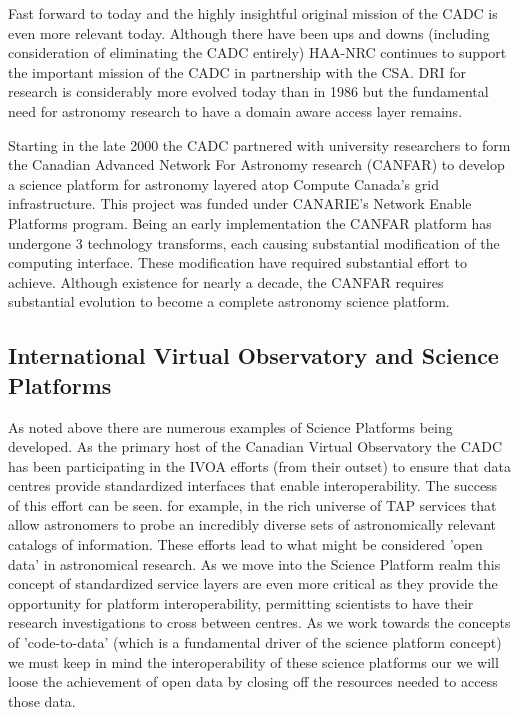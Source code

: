 \documentclass[11pt]{article}
\begin{document}
Fast forward to today and the highly insightful  original mission of the CADC is even more relevant today.  Although there have been ups and downs (including consideration of eliminating the CADC entirely) HAA-NRC continues to support the important mission of the CADC in partnership with the CSA. 
DRI for research is considerably more evolved today than in 1986 but the fundamental need for astronomy research to have a domain aware access layer remains. 

Starting in the late 2000 the CADC partnered with university researchers to form the Canadian Advanced Network For Astronomy research (CANFAR) to develop a science platform for astronomy layered atop Compute Canada's grid infrastructure.  This project was funded under CANARIE's Network Enable Platforms program.  Being an early implementation the CANFAR platform has undergone 3 technology transforms, each causing substantial modification of the computing interface.  These modification have required substantial effort to achieve.  Although existence for nearly a decade, the CANFAR requires substantial evolution to become a complete astronomy science platform. 

\subsection{International Virtual Observatory and Science Platforms}
As noted above there are numerous examples of Science Platforms being developed.  As the primary host of the Canadian Virtual Observatory the CADC has been participating in the IVOA efforts (from their outset) to ensure that data centres provide standardized interfaces that enable interoperability.  The success of this effort can be seen. for example, in the rich universe of TAP services that allow astronomers to probe an incredibly diverse sets of astronomically relevant catalogs of information. These efforts lead to what might be considered 'open data' in astronomical research. As we move into the Science Platform realm this concept of standardized service layers are even more critical as they provide the opportunity for platform interoperability, permitting scientists to have their research investigations to cross between centres.  As we work towards the concepts of 'code-to-data' (which is a fundamental driver of the science platform concept) we must keep in mind the interoperability of these science platforms our we will loose the achievement of open data by closing off the resources needed to access those data.
\end{document}
